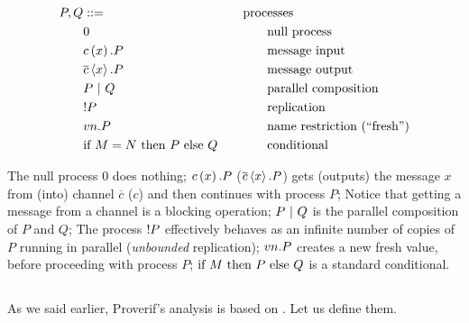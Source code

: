 \begin{equation}
    \label{eq:apic-processes}
    \begin{aligned}
        P, Q & ::=                \\
             & 0                  \\
             & c\left(x\right).P   \\
             & \overline{c}\left<x\right>.P  \\
             & P\ |\ Q      \\
             & !P        \\
             & vn.P    \\
             & \mbox{if}\ M=N\ \mbox{then}\ P\ \mbox{else}\ Q
    \end{aligned}
    \qquad
    \begin{aligned}
        \mbox{proc} & \mbox{esses}                        \\
                    & \mbox{null process}                 \\
                    & \mbox{message input}                \\
                    & \mbox{message output}               \\
                    & \mbox{parallel composition}         \\
                    & \mbox{replication}                  \\
                    & \mbox{name restriction (``fresh'')} \\
                    & \mbox{conditional}
    \end{aligned}
\end{equation}

The null process $0$ does nothing;
$c\left(x\right).P$ ($\overline{c}\left<x\right>.P$) gets (outputs) the message $x$ from (into) channel $\overline{c}$ ($c$) and then continues with process $P$; Notice that getting a message from a channel is a blocking operation;
$P\ |\ Q$ is the parallel composition of $P$ and $Q$;
The process $!P$ effectively behaves as an infinite number of copies of $P$ running in parallel (\textit{unbounded} replication);
$vn.P$ creates a new fresh value, before proceeding with process $P$;
$\mbox{if}\ M\ \mbox{then}\ P\ \mbox{else}\ Q$ is a standard conditional.

\subsection{\Horncs{}}

As we said earlier, Proverif's analysis is based on \Horncs{}. Let us define them.

